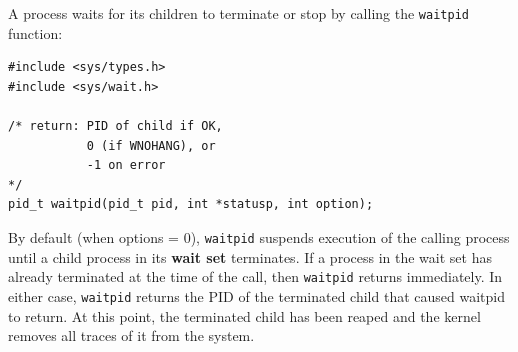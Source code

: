 \documentclass[11pt]{article}
\begin{document}
A process waits for its children to terminate or stop by calling the \texttt{waitpid} function:\\
\begin{verbatim}
#include <sys/types.h>
#include <sys/wait.h>

/* return: PID of child if OK,
           0 (if WNOHANG), or
           -1 on error
*/
pid_t waitpid(pid_t pid, int *statusp, int option);

\end{verbatim}
By default (when options = 0), \texttt{waitpid} suspends execution of the calling process until a child process in its \textbf{wait set} terminates. If a process in the wait set has already terminated at the time of the call, then \texttt{waitpid} returns immediately. In either case, \texttt{waitpid} returns the PID of the terminated child that caused waitpid to return. At this point, the terminated child has been reaped and the kernel removes all traces of it from the system.\\
\end{document}
